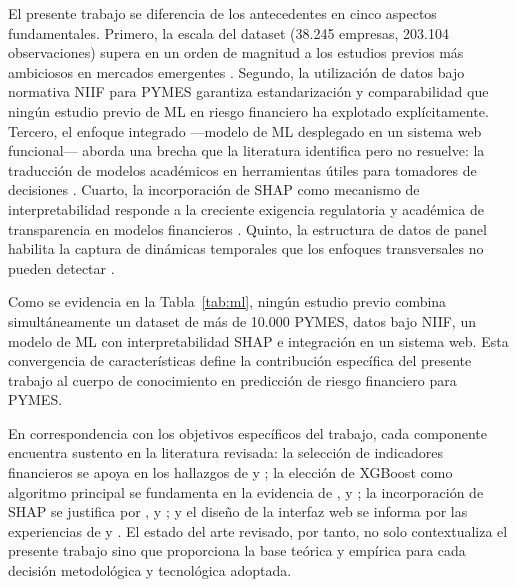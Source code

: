\documentclass[12pt, letterpaper]{article}
\begin{document}
El presente trabajo se diferencia de los antecedentes en cinco aspectos fundamentales. Primero, la escala del dataset (38.245 empresas, 203.104 observaciones) supera en un orden de magnitud a los estudios previos m\'as ambiciosos en mercados emergentes \citep{Mahesh2025}. Segundo, la utilizaci\'on de datos bajo normativa NIIF para PYMES garantiza estandarizaci\'on y comparabilidad que ning\'un estudio previo de ML en riesgo financiero ha explotado expl\'icitamente. Tercero, el enfoque integrado ---modelo de ML desplegado en un sistema web funcional--- aborda una brecha que la literatura identifica pero no resuelve: la traducci\'on de modelos acad\'emicos en herramientas \'utiles para tomadores de decisiones \citep{MayorgaLira2023, BaumontDeOliveira2021}. Cuarto, la incorporaci\'on de SHAP como mecanismo de interpretabilidad responde a la creciente exigencia regulatoria y acad\'emica de transparencia en modelos financieros \citep{Bussmann2020, Pathi2025, Bazarbash2019}. Quinto, la estructura de datos de panel habilita la captura de din\'amicas temporales que los enfoques transversales no pueden detectar \citep{Zhou2022, Otsuki2022}.

Como se evidencia en la Tabla~\ref{tab:ml}, ning\'un estudio previo combina simult\'aneamente un dataset de m\'as de 10.000 PYMES, datos bajo NIIF, un modelo de ML con interpretabilidad SHAP e integraci\'on en un sistema web. Esta convergencia de caracter\'isticas define la contribuci\'on espec\'ifica del presente trabajo al cuerpo de conocimiento en predicci\'on de riesgo financiero para PYMES.

En correspondencia con los objetivos espec\'ificos del trabajo, cada componente encuentra sustento en la literatura revisada: la selecci\'on de indicadores financieros se apoya en los hallazgos de \citet{Cultrera2016} y \citet{PtakChmielewska2020}; la elecci\'on de XGBoost como algoritmo principal se fundamenta en la evidencia de \citet{Dasilas2024}, \citet{Boumhidi2025} y \citet{ChenGuestrin2016}; la incorporaci\'on de SHAP se justifica por \citet{Bussmann2020}, \citet{Pathi2025} y \citet{Lundberg2017}; y el dise\~no de la interfaz web se informa por las experiencias de \citet{MayorgaLira2023} y \citet{BaumontDeOliveira2021}. El estado del arte revisado, por tanto, no solo contextualiza el presente trabajo sino que proporciona la base te\'orica y emp\'irica para cada decisi\'on metodol\'ogica y tecnol\'ogica adoptada.


\end{document}
